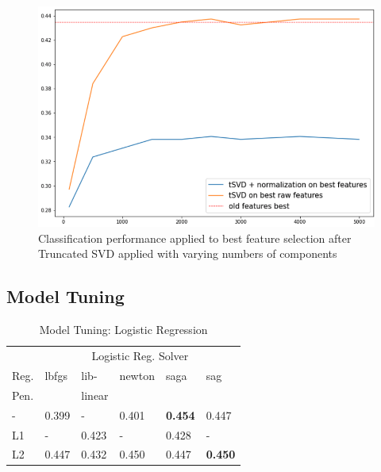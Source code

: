 \documentclass[11pt,a4paper]{article}
\begin{document}
\begin{figure}[htpb]
  \centering
  \includegraphics[width=1\linewidth]{imgs/tsvd.png}
  \caption{Classification performance applied to best feature
  selection after Truncated SVD applied with varying numbers of 
 components}%
  \label{fig:tsvd}
\end{figure}



\subsection{Model Tuning}%
\label{sub:model_tuning}



\begin{table}[h]
    \centering
    \caption{Model Tuning: Logistic Regression}
    \begin{tabular}{
    	l
        l
        l
        l
        l
        l
        }
        \toprule
        \multicolumn{1}{c}{} &
        \multicolumn{5}{c}{Logistic Reg. Solver}\\
        \cmidrule(lr){2-6} 
        {Reg.}& {lbfgs} &{lib-} &{newton}&{saga}& {sag}\\
        {Pen.} & {} &{linear}& {}&&{}\\
        \midrule
        - & 0.399 & - & 0.401 & \textbf{0.454} & 0.447\\
        L1 & - & 0.423 &  -&0.428& -\\
        L2 & 0.447& 0.432& 0.450& 0.447& \textbf{0.450}\\
        \bottomrule
    \end{tabular}
\end{table}
\end{document}
